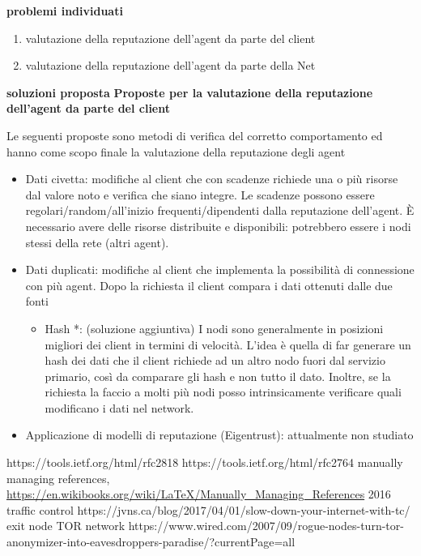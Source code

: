 \documentclass[]{article}
\begin{document}
	\pagebreak

	\textbf{problemi individuati}
	\begin{enumerate}
		\item valutazione della reputazione dell'agent da parte del client
		\item valutazione della reputazione dell'agent da parte della Net
	\end{enumerate}
	
	\textbf{soluzioni proposta}
	\textbf{Proposte per la valutazione della reputazione dell'agent da parte del client}
	
	Le seguenti proposte sono metodi di verifica del corretto comportamento ed hanno come scopo finale la valutazione della reputazione degli agent
	\begin{itemize}
		\item Dati civetta: modifiche al client che con scadenze richiede una o più risorse dal valore noto e verifica che siano integre. Le scadenze possono essere regolari/random/all’inizio frequenti/dipendenti dalla reputazione dell’agent. È necessario avere delle risorse distribuite e disponibili: potrebbero essere i nodi stessi della rete (altri agent).
		\item Dati duplicati: modifiche al client che implementa la possibilità di connessione con più agent. Dopo la richiesta il client compara i dati ottenuti dalle due fonti
		\begin{itemize}
			\item Hash *: (soluzione aggiuntiva) I nodi sono generalmente in posizioni migliori dei client in termini di velocità. L’idea è quella di far generare un hash dei dati che il client richiede ad un altro nodo fuori dal servizio primario, così da comparare gli hash e non tutto il dato.
			Inoltre, se la richiesta la faccio a molti più nodi posso intrinsicamente verificare quali modificano i dati nel network.
		\end{itemize}
		\item Applicazione di modelli di reputazione (Eigentrust): attualmente non studiato
	\end{itemize}

	
	\begin{thebibliography}{1}
			https://tools.ietf.org/html/rfc2818
			https://tools.ietf.org/html/rfc2764
			manually managing references, 
			\url{https://en.wikibooks.org/wiki/LaTeX/Manually_Managing_References}
			2016
			traffic control
			https://jvns.ca/blog/2017/04/01/slow-down-your-internet-with-tc/
			exit node TOR network
			https://www.wired.com/2007/09/rogue-nodes-turn-tor-anonymizer-into-eavesdroppers-paradise/?currentPage=all

	\end{thebibliography}
		
	\pagebreak
	
	
\end{document}

